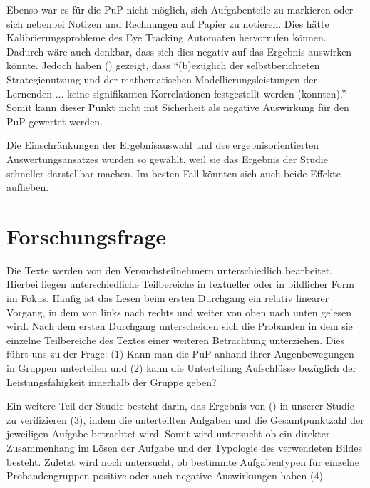 Ebenso war es für die \gls{PuP} nicht möglich, sich Aufgabenteile zu markieren oder sich nebenbei Notizen und Rechnungen auf Papier zu notieren. Dies hätte Kalibrierungsprobleme des Eye Tracking Automaten hervorrufen können. Dadurch wäre auch denkbar, dass sich dies negativ auf das Ergebnis auswirken könnte. Jedoch haben \citeauthor{schukajlow2011selbstberichtete} () gezeigt, dass ``(b)ezüglich der selbstberichteten Strategienutzung und der mathematischen Modellierungsleistungen der Lernenden ... keine signifikanten Korrelationen festgestellt werden (konnten).'' Somit kann dieser Punkt nicht mit Sicherheit als negative Auswirkung für den \gls{PuP} gewertet werden. 

Die Einschränkungen der Ergebnisauswahl und des ergebnisorientierten Auswertungsansatzes wurden so gewählt, weil sie das Ergebnis der Studie schneller darstellbar machen. Im besten Fall könnten sich auch beide Effekte aufheben.
\section{Forschungsfrage}

Die Texte werden von den Versuchsteilnehmern unterschiedlich bearbeitet. Hierbei liegen unterschiedliche Teilbereiche in textueller oder in bildlicher Form im Fokus. Häufig ist das Lesen beim ersten Durchgang ein relativ linearer Vorgang, in dem von links nach rechts und weiter von oben nach unten gelesen wird. Nach dem ersten Durchgang unterscheiden sich die Probanden in dem sie einzelne Teilbereiche des Textes einer weiteren Betrachtung unterziehen. Dies führt uns zu der Frage:
(1) Kann man die \gls{PuP} anhand ihrer Augenbewegungen in Gruppen unterteilen und (2) kann die Unterteilung Aufschlüsse bezüglich der Leistungsfähigkeit innerhalb der Gruppe geben?

Ein weitere Teil der Studie besteht darin, das Ergebnis von \citeauthor{bockmannvalue} () in unserer Studie zu verifizieren (3), indem die unterteilten Aufgaben und die Gesamtpunktzahl der jeweiligen Aufgabe betrachtet wird. Somit wird untersucht ob ein direkter Zusammenhang im Lösen der Aufgabe und der Typologie des verwendeten Bildes besteht. Zuletzt wird noch untersucht, ob bestimmte Aufgabentypen für einzelne Probandengruppen positive oder auch negative Auswirkungen haben (4).